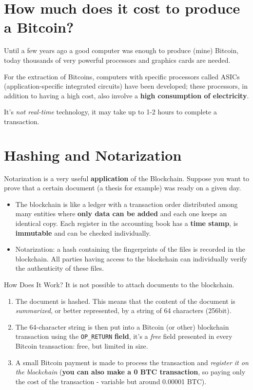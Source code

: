 \section{How much does it cost to produce a Bitcoin?}

Until a few years ago a good computer was enough to produce (mine) Bitcoin, today thousands of very powerful processors and graphics cards are needed.

For the extraction of Bitcoins, computers with specific processors called ASICs (application-specific integrated circuits) have been developed; these processors, in addition to having a high cost, also involve a \textbf{high consumption of electricity}.

It's \textit{not real-time} technology, it may take up to 1-2 hours to complete a transaction.

\section{Hashing and Notarization}

Notarization is a very useful \textbf{application} of the Blockchain. Suppose you want to prove that a certain document (a thesis for example) was ready on a given day.
\begin{itemize}
	\item The blockchain is like a ledger with a transaction order distributed among many entities where \textbf{only data can be added} and each one keeps an identical copy. Each register in the accounting book has a \textbf{time stamp}, is \textbf{immutable} and can be checked individually.
	\item Notarization: a hash containing the fingerprints of the files is recorded in the blockchain. All parties having access to the blockchain can individually verify the authenticity of these files.
\end{itemize}

How Does It Work? It is not possible to attach documents to the blockchain.
\begin{enumerate}
	\item The document is hashed. This means that the content of the document is \textit{summarized}, or better represented, by a string of 64 characters (256bit).
	\item The 64-character string is then put into a Bitcoin (or other) blockchain transaction using the \texttt{OP\_RETURN} \textbf{field}, it's a \textit{free} field presented in every Bitcoin transaction: free, but limited in size.
	\item A small Bitcoin payment is made to process the transaction and \textit{register it on the blockchain} (\textbf{you can also make a 0 BTC transaction}, so paying only the cost of the transaction - variable but around 0.00001 BTC).
\end{enumerate}

